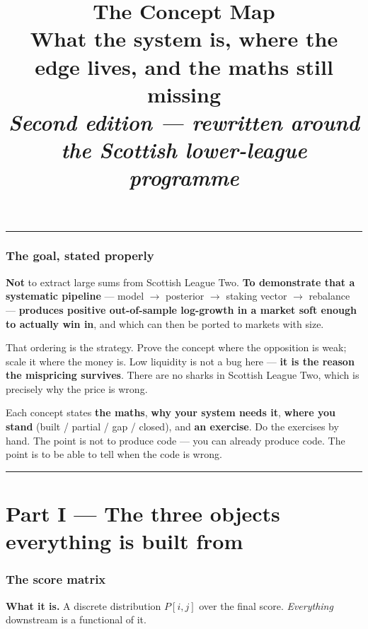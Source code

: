 \documentclass[11pt,a4paper]{article}
\title{\vspace{-1.2cm}\textbf{The Concept Map}\\[4pt]
\large What the system is, where the edge lives, and the maths still missing\\
\normalsize\itshape Second edition --- rewritten around the Scottish lower-league programme}
\author{}
\date{}
\begin{document}
\maketitle
\vspace{-1.2cm}
\begin{center}\rule{\textwidth}{0.4pt}\end{center}

\section*{The goal, stated properly}

\begin{tcolorbox}[enhanced, colback=teal!5, colframe=teal!55, boxrule=0.5pt, arc=1pt,
  fonttitle=\bfseries\sffamily\footnotesize, coltitle=teal, title={THE OBJECTIVE}]
\textbf{Not} to extract large sums from Scottish League Two. \textbf{To demonstrate that a systematic
pipeline} --- model $\to$ posterior $\to$ staking vector $\to$ rebalance --- \textbf{produces positive
out-of-sample log-growth in a market soft enough to actually win in}, and which can then be ported to
markets with size.

\smallskip
That ordering is the strategy. Prove the concept where the opposition is weak; scale it where the money is.
Low liquidity is not a bug here --- \textbf{it is the reason the mispricing survives}. There are no sharks in
Scottish League Two, which is precisely why the price is wrong.
\end{tcolorbox}

\medskip
\noindent
Each concept states \textbf{the maths}, \textbf{why your system needs it}, \textbf{where you stand}
(built / partial / gap / closed), and \textbf{an exercise}. Do the exercises by hand. The point is not to
produce code --- you can already produce code. The point is to be able to tell when the code is wrong.

\bigskip\hrule\bigskip

\part*{Part I --- The three objects everything is built from}

\section{The score matrix}

\textbf{What it is.} A discrete distribution $P[i,j]$ over the final score. \emph{Everything} downstream is a
functional of it.
\end{document}
